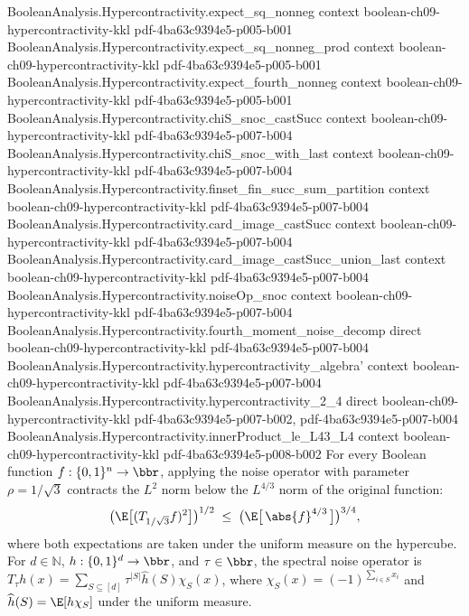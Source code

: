 \begin{theorem}[The $(4/3,2)$-hypercontractive inequality at $\rho=1/\sqrt3$]
\proofstep
  {BooleanAnalysis.Hypercontractivity.expect_sq_nonneg}
  {context}
  {boolean-ch09-hypercontractivity-kkl}
  {pdf-4ba63c9394e5-p005-b001}
\proofstep
  {BooleanAnalysis.Hypercontractivity.expect_sq_nonneg_prod}
  {context}
  {boolean-ch09-hypercontractivity-kkl}
  {pdf-4ba63c9394e5-p005-b001}
\proofstep
  {BooleanAnalysis.Hypercontractivity.expect_fourth_nonneg}
  {context}
  {boolean-ch09-hypercontractivity-kkl}
  {pdf-4ba63c9394e5-p005-b001}
\proofstep
  {BooleanAnalysis.Hypercontractivity.chiS_snoc_castSucc}
  {context}
  {boolean-ch09-hypercontractivity-kkl}
  {pdf-4ba63c9394e5-p007-b004}
\proofstep
  {BooleanAnalysis.Hypercontractivity.chiS_snoc_with_last}
  {context}
  {boolean-ch09-hypercontractivity-kkl}
  {pdf-4ba63c9394e5-p007-b004}
\proofstep
  {BooleanAnalysis.Hypercontractivity.finset_fin_succ_sum_partition}
  {context}
  {boolean-ch09-hypercontractivity-kkl}
  {pdf-4ba63c9394e5-p007-b004}
\proofstep
  {BooleanAnalysis.Hypercontractivity.card_image_castSucc}
  {context}
  {boolean-ch09-hypercontractivity-kkl}
  {pdf-4ba63c9394e5-p007-b004}
\proofstep
  {BooleanAnalysis.Hypercontractivity.card_image_castSucc_union_last}
  {context}
  {boolean-ch09-hypercontractivity-kkl}
  {pdf-4ba63c9394e5-p007-b004}
\proofstep
  {BooleanAnalysis.Hypercontractivity.noiseOp_snoc}
  {context}
  {boolean-ch09-hypercontractivity-kkl}
  {pdf-4ba63c9394e5-p007-b004}
\proofstep
  {BooleanAnalysis.Hypercontractivity.fourth_moment_noise_decomp}
  {direct}
  {boolean-ch09-hypercontractivity-kkl}
  {pdf-4ba63c9394e5-p007-b004}
\proofstep
  {BooleanAnalysis.Hypercontractivity.hypercontractivity_algebra'}
  {context}
  {boolean-ch09-hypercontractivity-kkl}
  {pdf-4ba63c9394e5-p007-b004}
\proofstep
  {BooleanAnalysis.Hypercontractivity.hypercontractivity_2_4}
  {direct}
  {boolean-ch09-hypercontractivity-kkl}
  {pdf-4ba63c9394e5-p007-b002,
    pdf-4ba63c9394e5-p007-b004}
\proofstep
  {BooleanAnalysis.Hypercontractivity.innerProduct_le_L43_L4}
  {context}
  {boolean-ch09-hypercontractivity-kkl}
  {pdf-4ba63c9394e5-p008-b002}
For every Boolean function $f:\{0,1\}^n\to\bbr$, applying the noise operator with
parameter $\rho=1/\sqrt3$ contracts the $L^2$ norm below the $L^{4/3}$ norm of the
original function:
\[
  \bigl(\E\bigl[(T_{1/\sqrt3} f)^2\bigr]\bigr)^{1/2}
  \;\le\;
  \bigl(\E\bigl[\,\abs{f}^{4/3}\,\bigr]\bigr)^{3/4},
\]
where both expectations are taken under the uniform measure on the hypercube. For
$d\in\mathbb N$, $h:\{0,1\}^d\to\bbr$, and $\tau\in\bbr$, the spectral noise operator is
$T_\tau h(x)=\sum_{S\subseteq[d]}\tau^{|S|}\widehat h(S)\chi_S(x)$, where
$\chi_S(x)=(-1)^{\sum_{i\in S}x_i}$ and $\widehat h(S)=\E[h\chi_S]$ under the uniform
measure.
\end{theorem}
